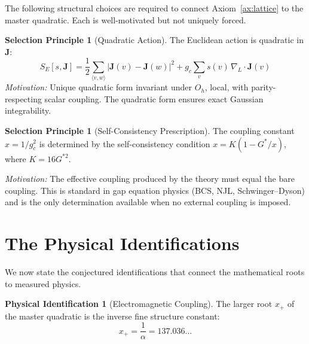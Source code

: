 \documentclass[12pt]{article}
\theoremstyle{definition}
\newtheorem{selection}[theorem]{Selection Principle}
\newtheorem{identification}[theorem]{Physical Identification}
\theoremstyle{remark}
\begin{document}
The following structural choices are required to connect Axiom~\ref{ax:lattice} to the master quadratic. Each is well-motivated but not uniquely forced.

\begin{selection}[Quadratic Action]
\label{sel:action}
The Euclidean action is quadratic in $\mathbf{J}$:
\begin{equation}
    S_E[s, \mathbf{J}] = \frac{1}{2}\sum_{\langle v,w\rangle} |\mathbf{J}(v) - \mathbf{J}(w)|^2 + g_c \sum_v s(v)\,\nabla_L \cdot \mathbf{J}(v)
\end{equation}
\emph{Motivation:} Unique quadratic form invariant under $O_h$, local, with parity-respecting scalar coupling. The quadratic form ensures exact Gaussian integrability.
\end{selection}

\begin{selection}[Self-Consistency Prescription]
\label{sel:gap}
The coupling constant $x = 1/g_c^2$ is determined by the self-consistency condition $x = K(1 - G^*/x)$, where $K = 16G^{*2}$.

\emph{Motivation:} The effective coupling produced by the theory must equal the bare coupling. This is standard in gap equation physics (BCS, NJL, Schwinger--Dyson) and is the only determination available when no external coupling is imposed.
\end{selection}

\section{The Physical Identifications}
\label{sec:identifications}

We now state the conjectured identifications that connect the mathematical roots to measured physics.

\begin{identification}[Electromagnetic Coupling]
\label{id:alpha}
The larger root $x_+$ of the master quadratic is the inverse fine structure constant:
\begin{equation}
    \boxed{\;x_+ = \frac{1}{\alpha} = 137.036\ldots\;}
\end{equation}
\end{identification}
\end{document}
